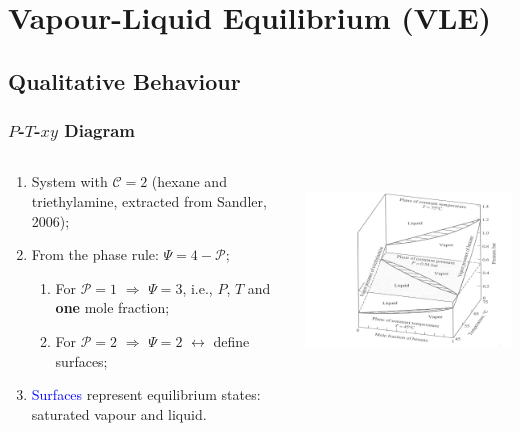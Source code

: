 \documentclass[10pt,compress,unknownkeysallowed]{beamer}
\begin{document}
\section{Vapour-Liquid Equilibrium (VLE)}

\subsection{Qualitative Behaviour}
\begin{frame}
  \frametitle{$P$-$T$-$xy$ Diagram}
  \begin{columns}
     \begin{column}[l]{0.3\linewidth}
        \begin{enumerate}
            \item<1-> System with $\mathcal{C} =2$ (hexane and triethylamine, extracted from Sandler, 2006);
            \item<2-> From the phase rule: $\Psi = 4 -\mathcal{P}$;
                \begin{enumerate}
                    \item<3-> For $\mathcal{P}=1$ $\Longrightarrow$ $\Psi=3$, i.e., $P$, $T$ and {\bf one} mole fraction;
                    \item<4-> For $\mathcal{P}=2$ $\Longrightarrow$ $\Psi=2$ $\leftrightarrow$ define surfaces;
                \end{enumerate}
            \item<5-> \textcolor{blue}{Surfaces} represent equilibrium states: saturated vapour and liquid.
        \end{enumerate}
     \end{column}
     \begin{column}[l]{0.7\linewidth}
        \hbox{\hspace{-1cm}
           \includegraphics[width=9.7cm,clip]{./../Pics/PTxy_diagram}}
     \end{column} 
  \end{columns}
\end{frame}
\normalsize
\end{document}
